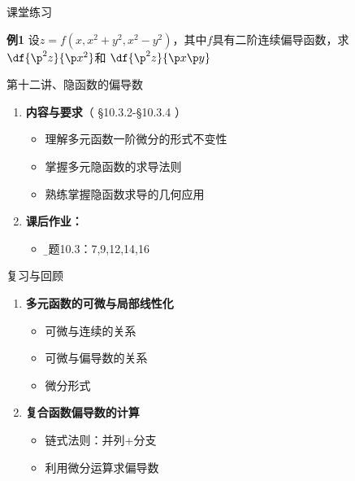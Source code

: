 
\begin{frame}{课堂练习}
	\linespread{1.2}
	\begin{exampleblock}{{\bf 例1}\hfill}
		设$z=f(x,x^2+y^2,x^2-y^2)$，其中$f$具有二阶连续偏导函数，求$\df{\p^2 z}{\p x^2}$和
		$\df{\p^2 z}{\p x\p y}$
	\end{exampleblock}
\end{frame}

\begin{frame}{第十二讲、隐函数的偏导数}
	\linespread{1.5}
	\begin{enumerate}
	  \item {\bf 内容与要求}{\color{blue}（ \S10.3.2-\S10.3.4 ）}
	  \begin{itemize}
	    \item 理解多元函数一阶微分的形式不变性
	    \item 掌握多元隐函数的求导法则
	    \item 熟练掌握隐函数求导的几何应用
	  \vspace{1em}
	  \end{itemize}
	  \item {\bf  课后作业：}
	  \begin{itemize}
	    \item {\b 习题10.3：7,9,12,14,16}
	  \end{itemize}
	\end{enumerate}
\end{frame}

\begin{frame}[<+->]{复习与回顾}
	\linespread{1.5}
	\begin{enumerate}
	  \item {\bf 多元函数的可微与局部线性化}
	  \begin{itemize}
	    \item 可微与连续的关系
	    \item 可微与偏导数的关系
	    \item 微分形式
	  \end{itemize}
	  \item {\bf 复合函数偏导数的计算}
	  \begin{itemize}
	    \item 链式法则：并列+分支
	    \item 利用微分运算求偏导数
	  \end{itemize}
	\end{enumerate}
\end{frame}


